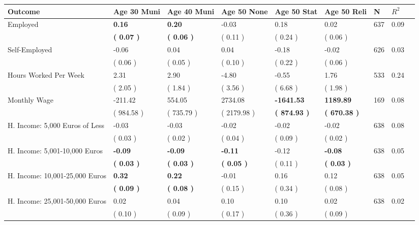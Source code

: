 \begin{tabular}{L{6.2cm} C{1.8cm} C{1.8cm} C{1.8cm} C{1.8cm} C{1.8cm} C{1.8cm} C{0.3cm} C{0.3cm}}
\toprule
 \textbf{Outcome} & \textbf{Age 30 Muni} & \textbf{Age 40 Muni} & \textbf{Age 50 None} & \textbf{Age 50 Stat} & \textbf{Age 50 Reli} & \textbf{N} & \textbf{$ R^2$} \\
\midrule
Employed & \textbf{     0.16} & \textbf{     0.20} &     -0.03 &      0.18 &      0.02  & 637 &       0.09 \\ 
 & \textbf{(     0.07 )} & \textbf{(     0.06 )} & (     0.11 ) & (     0.24 ) & (     0.06 )  & \\
Self-Employed &     -0.06 &      0.04 &      0.04 &     -0.18 &     -0.02  & 626 &       0.03 \\ 
 & (     0.06 ) & (     0.05 ) & (     0.10 ) & (     0.22 ) & (     0.06 )  & \\
Hours Worked Per Week &      2.31 &      2.90 &     -4.80 &     -0.55 &      1.76  & 533 &       0.24 \\ 
 & (     2.05 ) & (     1.84 ) & (     3.56 ) & (     6.68 ) & (     1.98 )  & \\
Monthly Wage &   -211.42 &    554.05 &   2734.08 & \textbf{ -1641.53} & \textbf{  1189.89}  & 169 &       0.08 \\ 
 & (   984.58 ) & (   735.79 ) & (  2179.98 ) & \textbf{(   874.93 )} & \textbf{(   670.38 )}  & \\
H. Income: 5,000 Euros of Less &     -0.03 &     -0.03 &     -0.02 &     -0.02 &     -0.02  & 638 &       0.08 \\ 
 & (     0.03 ) & (     0.02 ) & (     0.04 ) & (     0.09 ) & (     0.02 )  & \\
H. Income: 5,001-10,000 Euros & \textbf{    -0.09} & \textbf{    -0.09} & \textbf{    -0.11} &     -0.12 & \textbf{    -0.08}  & 638 &       0.05 \\ 
 & \textbf{(     0.03 )} & \textbf{(     0.03 )} & \textbf{(     0.05 )} & (     0.11 ) & \textbf{(     0.03 )}  & \\
H. Income: 10,001-25,000 Euros & \textbf{     0.32} & \textbf{     0.22} &     -0.01 &      0.16 &      0.12  & 638 &       0.05 \\ 
 & \textbf{(     0.09 )} & \textbf{(     0.08 )} & (     0.15 ) & (     0.34 ) & (     0.08 )  & \\
H. Income: 25,001-50,000 Euros &      0.02 &      0.04 &      0.10 &      0.10 &      0.02  & 638 &       0.02 \\ 
 & (     0.10 ) & (     0.09 ) & (     0.17 ) & (     0.36 ) & (     0.09 )  & \\

\end{tabular}
